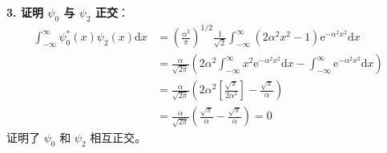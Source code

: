 \begin{solution}
\textbf{3. 证明 $\psi_0$ 与 $\psi_2$ 正交}：
\begin{align*}
    \int_{-\infty}^{\infty} \psi_0^*(x) \psi_2(x) \mathrm{d}x &= \left( \frac{\alpha^2}{\pi} \right)^{1/2} \frac{1}{\sqrt{2}} \int_{-\infty}^{\infty} (2\alpha^2 x^2 - 1) \mathrm{e}^{-\alpha^2 x^2} \mathrm{d}x \\
    &= \frac{\alpha}{\sqrt{2\pi}} \left( 2\alpha^2 \int_{-\infty}^{\infty} x^2 \mathrm{e}^{-\alpha^2 x^2} \mathrm{d}x - \int_{-\infty}^{\infty} \mathrm{e}^{-\alpha^2 x^2} \mathrm{d}x \right) \\
    &= \frac{\alpha}{\sqrt{2\pi}} \left( 2\alpha^2 \left[ \frac{\sqrt{\pi}}{2\alpha^3} \right] - \frac{\sqrt{\pi}}{\alpha} \right) \\
    &= \frac{\alpha}{\sqrt{2\pi}} \left( \frac{\sqrt{\pi}}{\alpha} - \frac{\sqrt{\pi}}{\alpha} \right) = 0
\end{align*}
证明了 $\psi_0$ 和 $\psi_2$ 相互正交。
\end{solution}

